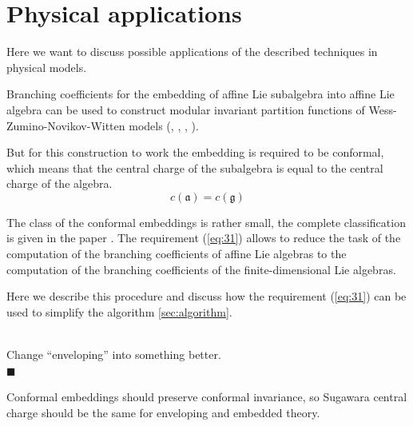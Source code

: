 \documentclass[a4paper,12pt]{article}
\theoremstyle{definition} \newtheorem{Def}{Definition}
\newenvironment{comment}
{\par\noindent{\bf TODO}\\}
{\\\hfill$\scriptstyle\blacksquare$\par}
\begin{document}
\newpage
\section{Physical applications}
\label{sec:phys-appl}
Here we want to discuss possible applications of the described techniques in physical models. 

Branching coefficients for the embedding of affine Lie subalgebra into
affine Lie algebra can be used to construct modular invariant
partition functions of Wess-Zumino-Novikov-Witten models (\cite{difrancesco1997cft}, \cite{Walton:1999xc}, \cite{walton1989conformal}, \cite{schellekens1986conformal}). 

But for this construction to work the embedding is required to be conformal, which means that the central charge of the subalgebra is equal to the central charge of the algebra.
\begin{equation}
  \label{eq:31}
  c(\mathfrak{a})=c(\mathfrak{g})
\end{equation}

 The class of the conformal embeddings is rather small, the complete classification is given in the paper \cite{schellekens1986conformal}. 
The requirement (\ref{eq:31}) allows to reduce the task of the computation of the branching coefficients of affine Lie algebras to the computation of the branching coefficients of the finite-dimensional Lie algebras.

Here we describe this procedure and discuss how the requirement (\ref{eq:31}) can be used to simplify the algorithm \ref{sec:algorithm}.

\begin{comment}
  Change ``enveloping'' into something better.
\end{comment}
Conformal embeddings should preserve conformal invariance, so Sugawara central charge should be the same for enveloping and embedded theory. 
\end{document}
